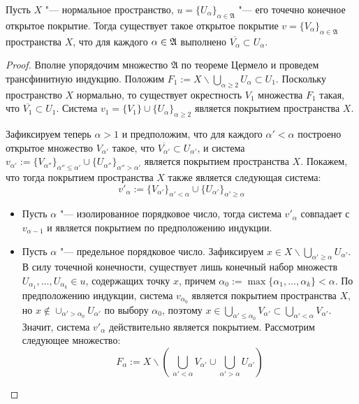 \begin{proposition}\label{propositionLef}
    Пусть $X$ "--- нормальное пространство, $u = \{ U_{\alpha}\}_{\alpha\in\mathfrak{A}}$ "--- его точечно конечное открытое покрытие. Тогда существует такое открытое покрытие $v = \{V_{\alpha}\}_{\alpha\in\mathfrak{A}}$ пространства $X$, что для каждого $\alpha \in \mathfrak A$ выполнено $\overline{V_{\alpha}}\subset U_{\alpha}$.
\end{proposition}

\begin{proof}
    Вполне упорядочим множество $\mathfrak{A}$ по теореме Цермело и проведем трансфинитную индукцию. Положим $F_1 := X\backslash \bigcup_{\alpha \geq 2}U_{\alpha} \subset U_1$. Поскольку пространство $X$ нормально, то существует окрестность $V_1$ множества $F_1$ такая, что $\overline{V_1} \subset U_1$. Система $v_1 = \{ V_1\}\cup\{U_{\alpha}\}_{\alpha\geq 2}$ является покрытием пространства $X$.
    
    Зафиксируем теперь $\alpha > 1$ и предположим, что для каждого $\alpha' < \alpha$ построено открытое множество $V_{\alpha'}$ такое, что $\overline{V_{\alpha'}} \subset U_{\alpha'}$, и система $v_{\alpha'} := \{ V_{\alpha''}\}_{\alpha'' \le \alpha'} \cup \{U_{\alpha''}\}_{\alpha'' > \alpha'}$ является покрытием пространства $X$. Покажем, что тогда покрытием пространства $X$ также является следующая система:
    \[v'_{\alpha} := \{ V_{\alpha'}\}_{\alpha'<\alpha}\cup\{U_{\alpha'}\}_{\alpha'\geq\alpha}\]
    \begin{itemize}
        \item Пусть $\alpha$ "--- изолированное порядковое число, тогда система $v'_{\alpha}$ совпадает с $v_{\alpha-1}$ и является покрытием по предположению индукции.
        
        \item Пусть $\alpha$ "--- предельное порядковое число. Зафиксируем $x \in
        X\backslash \bigcup_{\alpha'\geq \alpha}U_{\alpha'}$. В силу точечной конечности, существует лишь конечный набор множеств $U_{\alpha_1},\ldots, U_{\alpha_k} \in u$, содержащих точку $x$, причем $\alpha_0 := \max\{\alpha_1, \dotsc, \alpha_k\} < \alpha$. По предположению индукции, система $v_{\alpha_0}$ является покрытием пространства $X$, но $x\notin \cup_{\alpha'>\alpha_0} U_{\alpha'}$ по выбору $\alpha_0$, поэтому $x \in \bigcup_{\alpha' \le \alpha_0} V_{\alpha'} \subset \bigcup_{\alpha'<\alpha}V_{\alpha'}$. Значит, система $v'_{\alpha}$ действительно
        является покрытием. Рассмотрим следующее множество:
        \[F_{\alpha} := X\backslash \left(\,\bigcup_{\alpha'<\alpha}V_{\alpha'}\cup
        \bigcup_{\alpha'>\alpha}U_{\alpha'}\right)\]


\end{itemize}
\end{proof}
